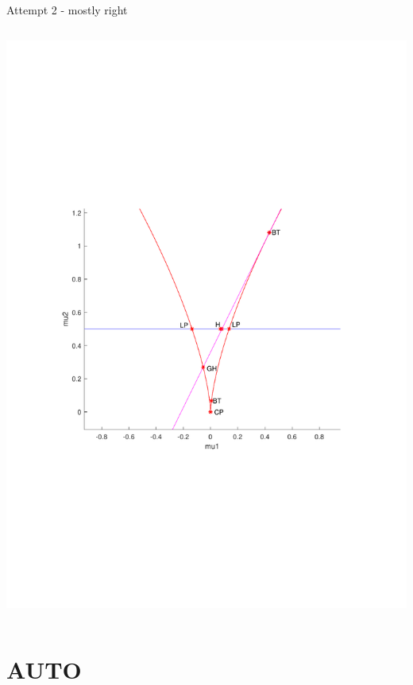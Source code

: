 \documentclass{beamer}
\begin{document}
\begin{frame}[label={sec:org36fbbac}]{Attempt 2 - mostly right}
\begin{columns}
\begin{column}{0.6\columnwidth}
\begin{center}
\includegraphics[trim={4cm 8cm 3cm 9cm}, clip,height=.8\textheight]{krassV2.pdf}
\end{center}
\end{column}
\end{columns}
\end{frame}
\section{AUTO}
\label{sec:org74030e8}
\end{document}
